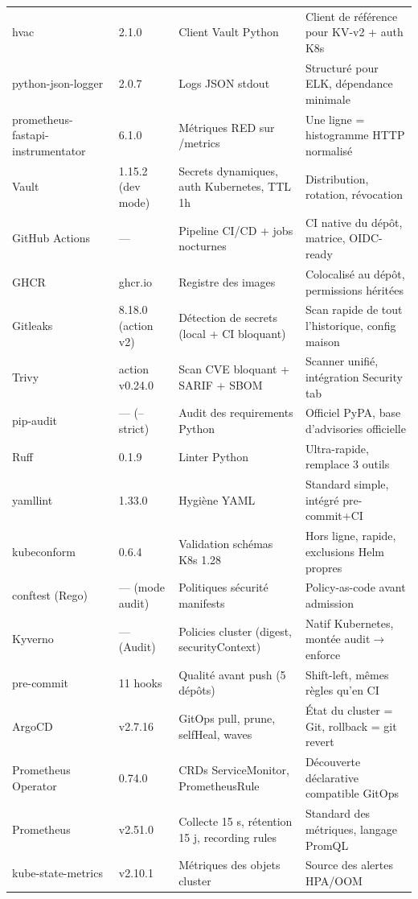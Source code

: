 \documentclass[11pt,a4paper]{article}
\begin{document}
{\begin{longtable}{@{}p{3.1cm}p{2.0cm}p{4.6cm}p{4.6cm}@{}}
hvac & 2.1.0 & Client Vault Python & Client de référence pour KV-v2 + auth K8s \\
python-json-logger & 2.0.7 & Logs JSON stdout & Structuré pour ELK, dépendance minimale \\
prometheus-fastapi-instrumentator & 6.1.0 & Métriques RED sur /metrics & Une ligne = histogramme HTTP normalisé \\
Vault & 1.15.2 (dev mode) & Secrets dynamiques, auth Kubernetes, TTL 1h & Distribution, rotation, révocation \\
GitHub Actions & --- & Pipeline CI/CD + jobs nocturnes & CI native du dépôt, matrice, OIDC-ready \\
GHCR & ghcr.io & Registre des images & Colocalisé au dépôt, permissions héritées \\
Gitleaks & 8.18.0 (action v2) & Détection de secrets (local + CI bloquant) & Scan rapide de tout l'historique, config maison \\
Trivy & action v0.24.0 & Scan CVE bloquant + SARIF + SBOM & Scanner unifié, intégration Security tab \\
pip-audit & --- (--strict) & Audit des requirements Python & Officiel PyPA, base d'advisories officielle \\
Ruff & 0.1.9 & Linter Python & Ultra-rapide, remplace 3 outils \\
yamllint & 1.33.0 & Hygiène YAML & Standard simple, intégré pre-commit+CI \\
kubeconform & 0.6.4 & Validation schémas K8s 1.28 & Hors ligne, rapide, exclusions Helm propres \\
conftest (Rego) & --- (mode audit) & Politiques sécurité manifests & Policy-as-code avant admission \\
Kyverno & --- (Audit) & Policies cluster (digest, securityContext) & Natif Kubernetes, montée audit$\to$enforce \\
pre-commit & 11 hooks & Qualité avant push (5 dépôts) & Shift-left, mêmes règles qu'en CI \\
ArgoCD & v2.7.16 & GitOps pull, prune, selfHeal, waves & État du cluster = Git, rollback = git revert \\
Prometheus Operator & 0.74.0 & CRDs ServiceMonitor, PrometheusRule & Découverte déclarative compatible GitOps \\
Prometheus & v2.51.0 & Collecte 15 s, rétention 15 j, recording rules & Standard des métriques, langage PromQL \\
kube-state-metrics & v2.10.1 & Métriques des objets cluster & Source des alertes HPA/OOM \\

\end{longtable}}
\end{document}
